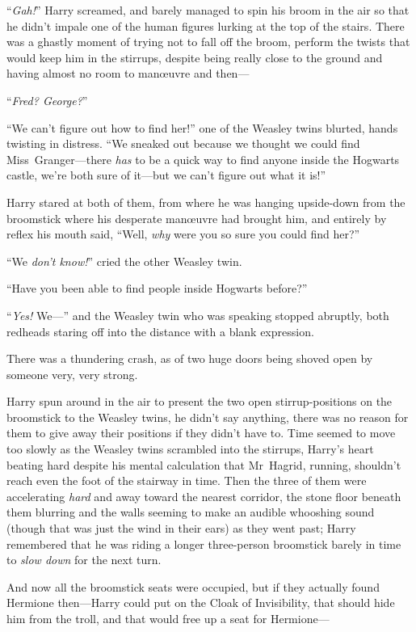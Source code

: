 “\emph{Gah!}” Harry screamed, and barely managed to spin his broom in the air so that he didn’t impale one of the human figures lurking at the top of the stairs. There was a ghastly moment of trying not to fall off the broom, perform the twists that would keep him in the stirrups, despite being really close to the ground and having almost no room to manœuvre and then—

“\emph{Fred? George?}”

“We can’t figure out how to find her!” one of the Weasley twins blurted, hands twisting in distress. “We sneaked out because we thought we could find Miss~Granger—there \emph{has} to be a quick way to find anyone inside the Hogwarts castle, we’re both sure of it—but we can’t figure out what it is!”

Harry stared at both of them, from where he was hanging upside-down from the broomstick where his desperate manœuvre had brought him, and entirely by reflex his mouth said, “Well, \emph{why} were you so sure you could find her?”

“We \emph{don’t know!}” cried the other Weasley twin.

“Have you been able to find people inside Hogwarts before?”

“\emph{Yes!} We—” and the Weasley twin who was speaking stopped abruptly, both redheads staring off into the distance with a blank expression.

There was a thundering crash, as of two huge doors being shoved open by someone very, very strong.

Harry spun around in the air to present the two open stirrup-positions on the broomstick to the Weasley twins, he didn’t say anything, there was no reason for them to give away their positions if they didn’t have to. Time seemed to move too slowly as the Weasley twins scrambled into the stirrups, Harry’s heart beating hard despite his mental calculation that Mr~Hagrid, running, shouldn’t reach even the foot of the stairway in time. Then the three of them were accelerating \emph{hard} and away toward the nearest corridor, the stone floor beneath them blurring and the walls seeming to make an audible whooshing sound (though that was just the wind in their ears) as they went past; Harry remembered that he was riding a longer three-person broomstick barely in time to \emph{slow down} for the next turn.

And now all the broomstick seats were occupied, but if they actually found Hermione then—Harry could put on the Cloak of Invisibility, that should hide him from the troll, and that would free up a seat for Hermione—

